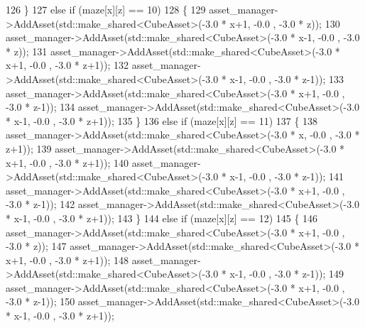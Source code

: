 \begin{DoxyCode}
126                             \}
127                         \textcolor{keywordflow}{else} \textcolor{keywordflow}{if} (maze[x][z] == 10)
128                             \{   
129                                 asset\_manager->AddAsset(std::make\_shared<CubeAsset>(-3.0 * x+1, -0.0 , -3.0
       * z));
130                                 asset\_manager->AddAsset(std::make\_shared<CubeAsset>(-3.0 * x-1, -0.0 , -3.0
       * z));
131                                 asset\_manager->AddAsset(std::make\_shared<CubeAsset>(-3.0 * x+1, -0.0 , -3.0
       * z+1));
132                                 asset\_manager->AddAsset(std::make\_shared<CubeAsset>(-3.0 * x-1, -0.0 , -3.0
       * z-1));
133                                 asset\_manager->AddAsset(std::make\_shared<CubeAsset>(-3.0 * x+1, -0.0 , -3.0
       * z-1));
134                                 asset\_manager->AddAsset(std::make\_shared<CubeAsset>(-3.0 * x-1, -0.0 , -3.0
       * z+1));
135                             \}
136                         \textcolor{keywordflow}{else} \textcolor{keywordflow}{if} (maze[x][z] == 11)
137                             \{   
138                                 asset\_manager->AddAsset(std::make\_shared<CubeAsset>(-3.0 * x,   -0.0 , -3.0
       * z+1));
139                                 asset\_manager->AddAsset(std::make\_shared<CubeAsset>(-3.0 * x+1, -0.0 , -3.0
       * z+1));
140                                 asset\_manager->AddAsset(std::make\_shared<CubeAsset>(-3.0 * x-1, -0.0 , -3.0
       * z-1));
141                                 asset\_manager->AddAsset(std::make\_shared<CubeAsset>(-3.0 * x+1, -0.0 , -3.0
       * z-1));
142                                 asset\_manager->AddAsset(std::make\_shared<CubeAsset>(-3.0 * x-1, -0.0 , -3.0
       * z+1));
143                             \}
144                         \textcolor{keywordflow}{else} \textcolor{keywordflow}{if} (maze[x][z] == 12)
145                             \{   
146                                 asset\_manager->AddAsset(std::make\_shared<CubeAsset>(-3.0 * x+1, -0.0 , -3.0
       * z));
147                                 asset\_manager->AddAsset(std::make\_shared<CubeAsset>(-3.0 * x+1, -0.0 , -3.0
       * z+1)); 
148                                 asset\_manager->AddAsset(std::make\_shared<CubeAsset>(-3.0 * x-1, -0.0 , -3.0
       * z-1)); 
149                                 asset\_manager->AddAsset(std::make\_shared<CubeAsset>(-3.0 * x+1, -0.0 , -3.0
       * z-1)); 
150                                 asset\_manager->AddAsset(std::make\_shared<CubeAsset>(-3.0 * x-1, -0.0 , -3.0
       * z+1)); 

\end{DoxyCode}
